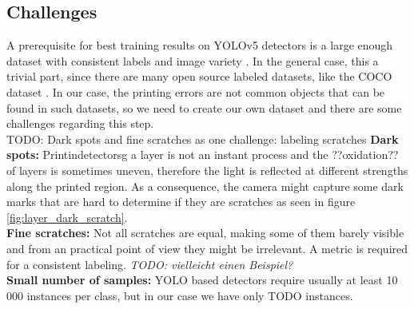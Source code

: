 \subsection{Challenges}
A prerequisite for best training results on YOLOv5 detectors is a large enough dataset with consistent labels and image variety \cite{yolov5_train_tips}. In the general case, this a trivial part, since there are many open source labeled datasets, like the COCO dataset \cite{coco}. In our case, the printing errors are not common objects that can be found in such datasets, so we need to create our own dataset and there are some challenges regarding this step.\\
TODO: Dark spots and fine scratches as one challenge: labeling scratches
\textbf{Dark spots:} Printindetectorsg a layer is not an instant process and the ??oxidation?? of layers is sometimes uneven, therefore the light is reflected at different strengths along the printed region. As a consequence, the camera might capture some dark marks that are hard to determine if they are scratches as seen in figure \ref{fig:layer_dark_scratch}.\\
\textbf{Fine scratches:} Not all scratches are equal, making some of them barely visible and from an practical point of view they might be irrelevant. A metric is required for a consistent labeling. \textit{TODO: vielleicht einen Beispiel?}\\
\textbf{Small number of samples:} YOLO based detectors require usually at least 10 000 instances per class, but in our case we have only TODO instances.


